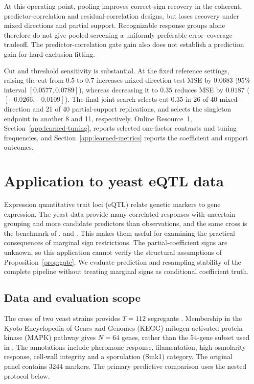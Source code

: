 \documentclass[lineno,pdflatex,sn-basic]{sn-jnl}
\theoremstyle{thmstyleone}
\begin{document}
At this operating point, pooling improves correct-sign recovery in the coherent,
predictor-correlation and residual-correlation designs, but loses recovery under
mixed directions and partial support. Recognizable response groups alone
therefore do not give pooled screening a uniformly preferable error--coverage
tradeoff. The predictor-correlation gate gain also does not establish a prediction
gain for hard-exclusion fitting.

Cut and threshold sensitivity is substantial. At the fixed reference settings,
raising the cut from $0.5$ to $0.7$ increases mixed-direction test MSE by $0.0683$
($95\%$ interval $[0.0577,0.0789]$), whereas decreasing it to $0.35$ reduces MSE
by $0.0187$ ($[-0.0266,-0.0109]$). The final joint search selects cut
$0.35$ in 26 of 40 mixed-direction and 21 of 40 partial-support replications,
and selects the singleton endpoint in another 8 and 11, respectively.
Online Resource~1, Section~\ref{app:learned-tuning}, reports selected one-factor contrasts and
tuning frequencies, and Section~\ref{app:learned-metrics} reports the
coefficient and support outcomes.

\FloatBarrier
\section{Application to yeast eQTL data} \label{sec:eqtl}

Expression quantitative trait loci (eQTL) relate genetic markers to gene
expression. The yeast data provide many correlated responses with uncertain grouping and
more candidate predictors than observations, and the same cross is the
benchmark of \citet{Yin+Li:2011}, \citet{Kim+Xing:2012} and
\citet{Li+Nan+Zhu:2015}. This makes them useful for examining the practical
consequences of marginal sign restrictions. The partial-coefficient signs are
unknown, so this application cannot verify the structural assumptions of
Proposition~\ref{prop:gate}. We evaluate prediction and resampling stability
of the complete pipeline without treating marginal signs as conditional
coefficient truth.

\subsection{Data and evaluation scope} \label{sec:eqtl-data}

The cross of two yeast strains provides $T=112$ segregants
\citep{Brem+Kruglyak:2005}. Membership in the Kyoto Encyclopedia of Genes and Genomes (KEGG)
mitogen-activated protein kinase (MAPK) pathway gives $N=64$
genes, rather than the 54-gene subset used in
\citet{Yin+Li:2011}. The annotations include pheromone response,
filamentation, high-osmolarity response, cell-wall integrity and a sporulation
(Smk1) category.
The original panel contains 3244 markers. The primary predictive comparison
uses the nested protocol below.
\end{document}
